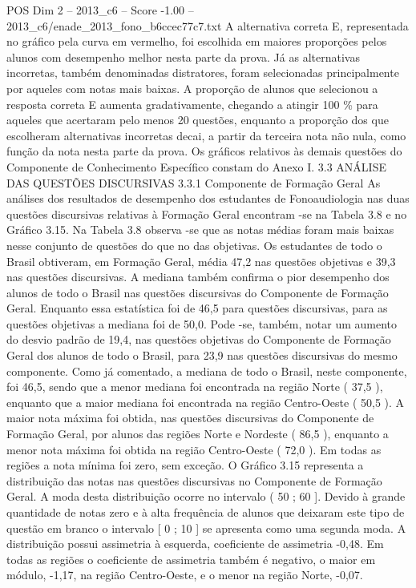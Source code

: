 \begin{textsample}{POS Dim 2 – 2013\_c6 – Score -1.00 – 2013\_c6/enade\_2013\_fono\_b6ccec77c7.txt}
A alternativa correta E, representada no gráfico pela curva em vermelho, foi escolhida em maiores proporções pelos alunos com desempenho melhor nesta parte da prova.
Já as alternativas incorretas, também denominadas distratores, foram selecionadas principalmente por aqueles com notas mais baixas.
A proporção de alunos que selecionou a resposta correta E aumenta gradativamente, chegando a atingir 100 \% para aqueles que acertaram pelo menos 20 questões, enquanto a proporção dos que escolheram alternativas incorretas decai, a partir da terceira nota não nula, como função da nota nesta parte da prova.
Os gráficos relativos às demais questões do Componente de Conhecimento Específico constam do Anexo I. 3.3 ANÁLISE DAS QUESTÕES DISCURSIVAS 3.3.1 Componente de Formação Geral As análises dos resultados de desempenho dos estudantes de Fonoaudiologia nas duas questões discursivas relativas à Formação Geral encontram -se na Tabela 3.8 e no Gráfico 3.15.
Na Tabela 3.8 observa -se que as notas médias foram mais baixas nesse conjunto de questões do que no das objetivas.
Os estudantes de todo o Brasil obtiveram, em Formação Geral, média 47,2 nas questões objetivas e 39,3 nas questões discursivas.
A mediana também confirma o pior desempenho dos alunos de todo o Brasil nas questões discursivas do Componente de Formação Geral.
Enquanto essa estatística foi de 46,5 para questões discursivas, para as questões objetivas a mediana foi de 50,0.
Pode -se, também, notar um aumento do desvio padrão de 19,4, nas questões objetivas do Componente de Formação Geral dos alunos de todo o Brasil, para 23,9 nas questões discursivas do mesmo componente.
Como já comentado, a mediana de todo o Brasil, neste componente, foi 46,5, sendo que a menor mediana foi encontrada na região Norte ( 37,5 ), enquanto que a maior mediana foi encontrada na região Centro-Oeste ( 50,5 ).
A maior nota máxima foi obtida, nas questões discursivas do Componente de Formação Geral, por alunos das regiões Norte e Nordeste ( 86,5 ), enquanto a menor nota máxima foi obtida na região Centro-Oeste ( 72,0 ).
Em todas as regiões a nota mínima foi zero, sem exceção.
O Gráfico 3.15 representa a distribuição das notas nas questões discursivas no Componente de Formação Geral.
A moda desta distribuição ocorre no intervalo ( 50 ; 60 ].
Devido à grande quantidade de notas zero e à alta frequência de alunos que deixaram este tipo de questão em branco o intervalo [ 0 ; 10 ] se apresenta como uma segunda moda.
A distribuição possui assimetria à esquerda, coeficiente de assimetria -0,48.
Em todas as regiões o coeficiente de assimetria também é negativo, o maior em módulo, -1,17, na região Centro-Oeste, e o menor na região Norte, -0,07.

\end{textsample}
